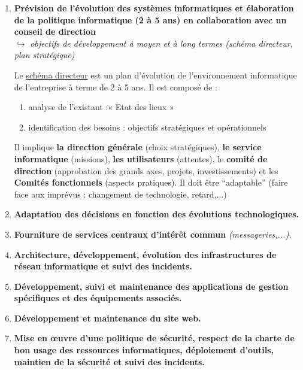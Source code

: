 \documentclass[10pt,a4paper,oneside,titlepage]{report}
\newcommand{\titre}[1]{\textcolor{title}{#1}}
\newcommand{\strong}[1]{\textbf{\titre{#1}}}
\begin{document}
\begin{sffamily}
\begin{enumerate}
\item  \textbf{\strong{Prévision de l'évolution des systèmes informatiques et élaboration de la politique informatique} (2 à 5 ans) en collaboration avec un conseil de 
direction} \\
$\hookrightarrow$ \textit{objectifs de développement à moyen et à long termes (schéma directeur, plan stratégique)}

Le \underline{schéma directeur} est un plan d'évolution de l'environnement informatique de l'entreprise à terme de 2 à 5 ans. Il est composé de : \begin{enumerate}
\item analyse de l’existant :« Etat des lieux »
\item identification des besoins : objectifs stratégiques et opérationnels
\end{enumerate}
Il implique \textbf{la direction générale} (choix stratégiques), \textbf{le service informatique} (missions), \textbf{les utilisateurs} (attentes), le \textbf{comité de 
direction} (approbation des grands axes, projets, investissements) et les \textbf{Comités fonctionnels} (aspects pratiques).
Il doit être ``adaptable'' (faire face aux imprévus : changement de technologie, retard,...)\\

\item \strong{Adaptation des décisions en fonction des évolutions technologiques.} \\

\item \strong{Fourniture de services centraux d'intér\^et commun} \textit{(messageries,...).}\\

\item \strong{Architecture, développement, évolution des infrastructures de réseau informatique et suivi des incidents.}\\

\item \strong{Développement, suivi et maintenance des applications de gestion spécifiques et des équipements associés.}\\

\item \strong{Développement et maintenance du site web.}\\

\item \strong{Mise en œuvre d'une politique de sécurité, respect de la charte de bon usage des ressources informatiques, déploiement d'outils, maintien de la sécurité et 
suivi des incidents.}\\


\end{enumerate}
\end{sffamily}
\end{document}
